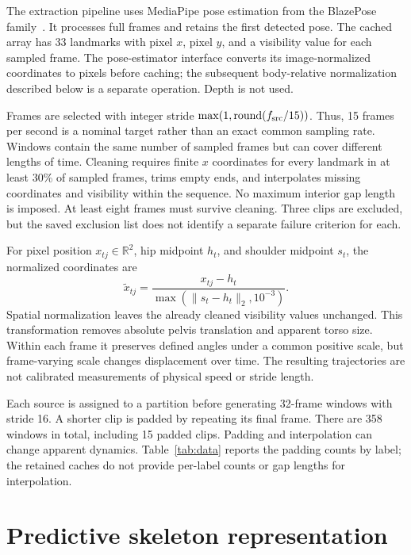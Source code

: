 \documentclass[10pt,twocolumn,letterpaper]{article}
\begin{document}
The extraction pipeline uses MediaPipe pose estimation from the BlazePose family~\cite{blazepose}. It processes full frames and retains the first detected pose. The cached array has 33 landmarks with pixel $x$, pixel $y$, and a visibility value for each sampled frame. The pose-estimator interface converts its image-normalized coordinates to pixels before caching; the subsequent body-relative normalization described below is a separate operation. Depth is not used.

Frames are selected with integer stride $\max(1,\operatorname{round}(f_{\rm src}/15))$. Thus, 15 frames per second is a nominal target rather than an exact common sampling rate. Windows contain the same number of sampled frames but can cover different lengths of time. Cleaning requires finite $x$ coordinates for every landmark in at least 30\% of sampled frames, trims empty ends, and interpolates missing coordinates and visibility within the sequence. No maximum interior gap length is imposed. At least eight frames must survive cleaning. Three clips are excluded, but the saved exclusion list does not identify a separate failure criterion for each.

For pixel position $x_{tj}\in\mathbb{R}^2$, hip midpoint $h_t$, and shoulder midpoint $s_t$, the normalized coordinates are
\begin{equation}
\widetilde{x}_{tj}=\frac{x_{tj}-h_t}{\max(\|s_t-h_t\|_2,10^{-3})}.
\label{eq:normalization}
\end{equation}
Spatial normalization leaves the already cleaned visibility values unchanged. This transformation removes absolute pelvis translation and apparent torso size. Within each frame it preserves defined angles under a common positive scale, but frame-varying scale changes displacement over time. The resulting trajectories are not calibrated measurements of physical speed or stride length.

Each source is assigned to a partition before generating 32-frame windows with stride 16. A shorter clip is padded by repeating its final frame. There are 358 windows in total, including 15 padded clips. Padding and interpolation can change apparent dynamics. Table~\ref{tab:data} reports the padding counts by label; the retained caches do not provide per-label counts or gap lengths for interpolation.

\section{Predictive skeleton representation}
\end{document}

